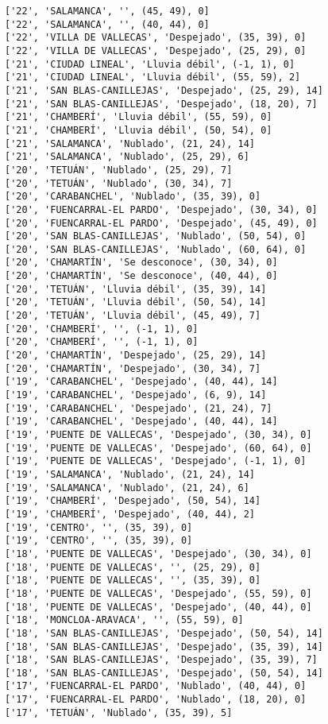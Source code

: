 \documentclass[11pt]{article}
\begin{document}
\begin{Verbatim}[commandchars=\\\{\}]
['22', 'SALAMANCA', '', (45, 49), 0]
['22', 'SALAMANCA', '', (40, 44), 0]
['22', 'VILLA DE VALLECAS', 'Despejado', (35, 39), 0]
['22', 'VILLA DE VALLECAS', 'Despejado', (25, 29), 0]
['21', 'CIUDAD LINEAL', 'Lluvia débil', (-1, 1), 0]
['21', 'CIUDAD LINEAL', 'Lluvia débil', (55, 59), 2]
['21', 'SAN BLAS-CANILLEJAS', 'Despejado', (25, 29), 14]
['21', 'SAN BLAS-CANILLEJAS', 'Despejado', (18, 20), 7]
['21', 'CHAMBERÍ', 'Lluvia débil', (55, 59), 0]
['21', 'CHAMBERÍ', 'Lluvia débil', (50, 54), 0]
['21', 'SALAMANCA', 'Nublado', (21, 24), 14]
['21', 'SALAMANCA', 'Nublado', (25, 29), 6]
['20', 'TETUÁN', 'Nublado', (25, 29), 7]
['20', 'TETUÁN', 'Nublado', (30, 34), 7]
['20', 'CARABANCHEL', 'Nublado', (35, 39), 0]
['20', 'FUENCARRAL-EL PARDO', 'Despejado', (30, 34), 0]
['20', 'FUENCARRAL-EL PARDO', 'Despejado', (45, 49), 0]
['20', 'SAN BLAS-CANILLEJAS', 'Nublado', (50, 54), 0]
['20', 'SAN BLAS-CANILLEJAS', 'Nublado', (60, 64), 0]
['20', 'CHAMARTÍN', 'Se desconoce', (30, 34), 0]
['20', 'CHAMARTÍN', 'Se desconoce', (40, 44), 0]
['20', 'TETUÁN', 'Lluvia débil', (35, 39), 14]
['20', 'TETUÁN', 'Lluvia débil', (50, 54), 14]
['20', 'TETUÁN', 'Lluvia débil', (45, 49), 7]
['20', 'CHAMBERÍ', '', (-1, 1), 0]
['20', 'CHAMBERÍ', '', (-1, 1), 0]
['20', 'CHAMARTÍN', 'Despejado', (25, 29), 14]
['20', 'CHAMARTÍN', 'Despejado', (30, 34), 7]
['19', 'CARABANCHEL', 'Despejado', (40, 44), 14]
['19', 'CARABANCHEL', 'Despejado', (6, 9), 14]
['19', 'CARABANCHEL', 'Despejado', (21, 24), 7]
['19', 'CARABANCHEL', 'Despejado', (40, 44), 14]
['19', 'PUENTE DE VALLECAS', 'Despejado', (30, 34), 0]
['19', 'PUENTE DE VALLECAS', 'Despejado', (60, 64), 0]
['19', 'PUENTE DE VALLECAS', 'Despejado', (-1, 1), 0]
['19', 'SALAMANCA', 'Nublado', (21, 24), 14]
['19', 'SALAMANCA', 'Nublado', (21, 24), 6]
['19', 'CHAMBERÍ', 'Despejado', (50, 54), 14]
['19', 'CHAMBERÍ', 'Despejado', (40, 44), 2]
['19', 'CENTRO', '', (35, 39), 0]
['19', 'CENTRO', '', (35, 39), 0]
['18', 'PUENTE DE VALLECAS', 'Despejado', (30, 34), 0]
['18', 'PUENTE DE VALLECAS', '', (25, 29), 0]
['18', 'PUENTE DE VALLECAS', '', (35, 39), 0]
['18', 'PUENTE DE VALLECAS', 'Despejado', (55, 59), 0]
['18', 'PUENTE DE VALLECAS', 'Despejado', (40, 44), 0]
['18', 'MONCLOA-ARAVACA', '', (55, 59), 0]
['18', 'SAN BLAS-CANILLEJAS', 'Despejado', (50, 54), 14]
['18', 'SAN BLAS-CANILLEJAS', 'Despejado', (35, 39), 14]
['18', 'SAN BLAS-CANILLEJAS', 'Despejado', (35, 39), 7]
['18', 'SAN BLAS-CANILLEJAS', 'Despejado', (50, 54), 14]
['17', 'FUENCARRAL-EL PARDO', 'Nublado', (40, 44), 0]
['17', 'FUENCARRAL-EL PARDO', 'Nublado', (18, 20), 0]
['17', 'TETUÁN', 'Nublado', (35, 39), 5]

\end{Verbatim}
\end{document}
